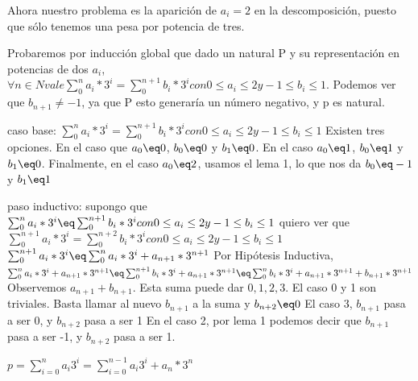\documentclass[spanish,12pt]{article}
\begin{document}
Ahora nuestro problema es la aparición de $a_i=2$ en la descomposición, puesto que sólo tenemos una pesa por potencia de tres.

Probaremos por inducción global  que dado un natural P y su representación en potencias de dos $a_{i}$, $ \forall n \in N vale  \sum_{0}^{n}{a_{i}*3^{i}}= \sum_{0}^{n+1}{b_{i}*3^{i}} con 0\leq a_{i} \leq 2 y -1 \leq b_{i} \leq 1$. Podemos ver que $b_{n+1}\neq -1$, ya que P esto generaría un número negativo, y p es natural.

caso base:
$\sum_{0}^{n}{a_{i}*3^{i}}= \sum_{0}^{n+1}{b_{i}*3^{i}} con 0\leq a_{i} \leq 2 y -1 \leq b_{i} \leq 1$
Existen tres opciones. En el caso que $a_{0} \eq 0$, $b_{0} \eq 0$ y $b_{1} \eq 0$.
En el caso $a_{0} \eq 1$, $b_{0} \eq 1$ y $b_{1} \eq 0$.
Finalmente, en el caso $a_{0} \eq 2$, usamos el lema 1, lo que nos da $b_{0} \eq -1$ y $b_{1} \eq 1$

paso inductivo:
 supongo que $\sum_{0}^{n}{a_{i}*3^{i}} \eq \sum_{0}^{n+1}{b_{i}*3^{i}} con 0\leq a_{i} \leq 2 y -1 \leq b_{i} \leq 1$
 quiero ver que $\sum_{0}^{n+1}{a_{i}*3^{i}}= \sum_{0}^{n+2}{b_{i}*3^{i}} con 0\leq a_{i} \leq 2 y -1 \leq b_{i} \leq 1$
\\
$\sum_{0}^{n+1}{a_{i}*3^{i}} \eq \sum_{0}^{n}{a_{i}*3^{i}} + a_{n+1}*3^{n+1}$
Por Hipótesis Inductiva, $ \sum_{0}^{n}{a_{i}*3^{i}} + a_{n+1}*3^{n+1} \eq \sum_{0}^{n+1}{b_{i}*3^{i}} + a_{n+1}*3^{n+1} \eq \sum_{0}^{n}{b_{i}*3^{i}} + a_{n+1}*3^{n+1} + b_{n+1}*3^{n+1} $
Observemos $a_{n+1} + b_{n+1}$. Esta suma puede dar $0,1,2,3$.
El caso 0 y 1 son triviales. Basta llamar al nuevo $b_{n+1}$ a la suma y $b_{n+2} \eq 0$
El caso 3, $b_{n+1}$ pasa a ser 0, y $b_{n+2}$ pasa a ser 1
En el caso 2, por lema 1 podemos decir que $b_{n+1}$ pasa a ser -1, y $b_{n+2}$ pasa a ser 1.




$p= \sum_{i=0}^{n}{a_i 3^{i}} =  \sum_{i=0}^{n-1}{a_i 3^{i}} + a_n*3^{n}$
\end{document}
